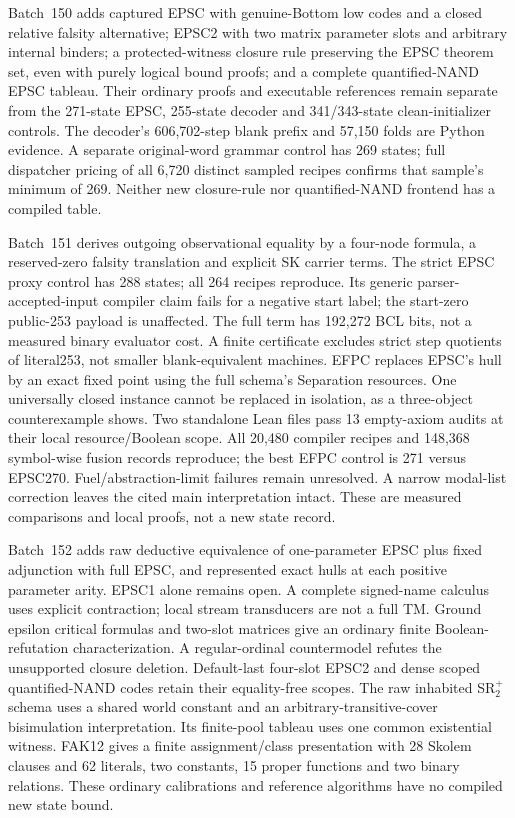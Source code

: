 \documentclass[11pt]{article}
\begin{document}
{Batch~150 adds captured EPSC with genuine-Bottom low codes and a closed relative
falsity alternative; EPSC2 with two matrix parameter slots and arbitrary internal
binders; a protected-witness closure rule preserving the EPSC theorem set, even
with purely logical bound proofs; and a complete quantified-NAND EPSC tableau.
Their ordinary proofs and executable references remain separate from the
271-state EPSC, 255-state decoder and 341/343-state clean-initializer controls.
The decoder's 606,702-step blank prefix and 57,150 folds are Python evidence.
A separate original-word grammar control has 269 states; full dispatcher pricing
of all 6,720 distinct sampled recipes confirms that sample's minimum of 269.
Neither new closure-rule nor quantified-NAND frontend has a compiled table.

Batch~151 derives outgoing observational equality by a four-node formula,
a reserved-zero falsity translation and explicit SK carrier terms. The strict
EPSC proxy control has 288 states; all 264 recipes reproduce. Its generic
parser-accepted-input compiler claim fails for a negative start label; the
start-zero public-253 payload is unaffected. The full term has 192,272 BCL bits,
not a measured binary evaluator cost. A finite certificate excludes strict
step quotients of literal253, not smaller blank-equivalent machines.
EFPC replaces EPSC's hull by an exact fixed point using the full schema's
Separation resources. One universally closed instance cannot be replaced in
isolation, as a three-object counterexample shows. Two standalone Lean files
pass 13 empty-axiom audits at their local resource/Boolean scope. All 20,480
compiler recipes and 148,368 symbol-wise fusion records reproduce; the best
EFPC control is 271 versus EPSC270. Fuel/abstraction-limit failures remain
unresolved. A narrow modal-list correction leaves the cited main interpretation
intact. These are measured comparisons and local proofs, not a new state record.

Batch~152 adds raw deductive equivalence of one-parameter EPSC plus fixed
adjunction with full EPSC, and represented exact hulls at each positive
parameter arity. EPSC1 alone remains open. A complete signed-name calculus
uses explicit contraction; local stream transducers are not a full TM.
Ground epsilon critical formulas and two-slot matrices give an ordinary
finite Boolean-refutation characterization. A regular-ordinal countermodel
refutes the unsupported closure deletion. Default-last four-slot EPSC2 and
dense scoped quantified-NAND codes retain their equality-free scopes.
The raw inhabited SR$_2^+$ schema uses a shared world constant and an
arbitrary-transitive-cover bisimulation interpretation. Its finite-pool
tableau uses one common existential witness. FAK12 gives a finite
assignment/class presentation with 28 Skolem clauses and 62 literals,
two constants, 15 proper functions and two binary relations. These ordinary
calibrations and reference algorithms have no compiled new state bound.

}
\end{document}
